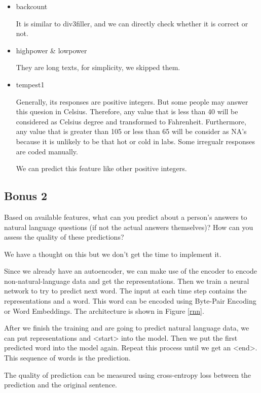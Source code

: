 \documentclass[11pt, a4paper]{article}
\begin{document}
\begin{itemize}
	\item {backcount}
	\par{It is similar to div3filler, and we can directly check whether it is correct or not.
}
	
	\item {highpower \& lowpower}
	\par{They are long texts, for simplicity, we skipped them.
}

	\item {tempest1}
	\par{Generally, its responses are positive integers. But some people may answer this quesion in Celsius. Therefore, any value that is less than 40 will be considered as Celsius degree and transformed to Fahrenheit. Furthermore, any value that is greater than 105 or less than 65 will be consider as NA's because it is unlikely to be that hot or cold in labs. Some irregualr responses are coded manually.}
	\par{We can predict this feature like other positive integers.}
\end{itemize}

\subsection{Bonus 2}

\par{Based on available
	features, what can you predict about a person’s answers to natural language questions (if not the actual answers
	themselves)? How can you assess the quality of these predictions?}
\par{We have a thought on this but we don't get the time to implement it.}
\par{Since we already have an autoencoder, we can make use of the encoder to encode non-natural-language data and get the representations. Then we train a neural network to try to predict next word. The input at each time step contains the representations and a word. This word can be encoded using Byte-Pair Encoding or Word Embeddings. The architecture is shown in Figure \ref{rnn}.}
\par{After we finish the training and are going to predict natural language data, we can put representations and <start> into the model. Then we put the first predicted word into the model again. Repeat this process until we get an <end>. This sequence of words is the prediction.}
\par{The quality of prediction can be measured using cross-entropy loss between the prediction and the original sentence. }
\end{document}
